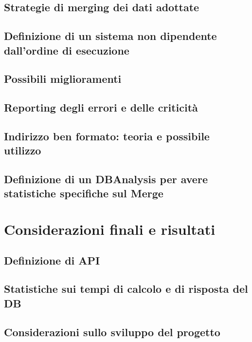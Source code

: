 \documentclass[12pt]{report}
\begin{document}
\newpage
\section{Strategie di merging dei dati adottate}

\newpage
\section{Definizione di un sistema non dipendente dall'ordine di esecuzione}

\newpage
\section{Possibili miglioramenti}

\newpage
\section{Reporting degli errori e delle criticità}

\newpage
\section{Indirizzo ben formato: teoria e possibile utilizzo}

\newpage
\section{Definizione di un DBAnalysis per avere statistiche specifiche sul Merge}


\chapter{Considerazioni finali e risultati}
\label{cap3}

\section{Definizione di API}

\newpage
\section{Statistiche sui tempi di calcolo e di risposta del DB}

\newpage
\section{Considerazioni sullo sviluppo del progetto}
\end{document}
